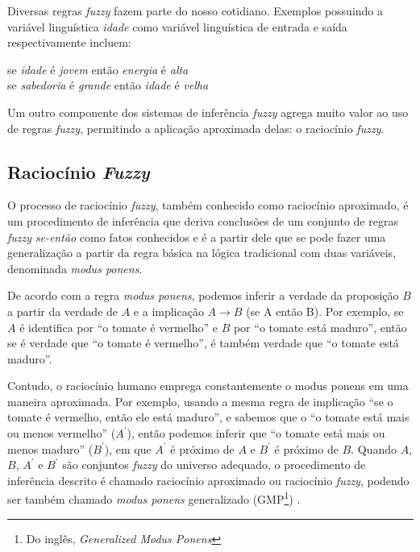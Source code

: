 Diversas regras \textit{fuzzy} fazem parte do nosso cotidiano. Exemplos possuindo a variável linguística \textit{idade} como variável linguística de entrada e saída respectivamente incluem:
\begin{center}
se \textit{idade} é \textit{jovem} então \textit{energia} é \textit{alta} \\
se \textit{sabedoria} é \textit{grande} então \textit{idade} é \textit{velha}
\end{center}

Um outro componente dos sistemas de inferência \textit{fuzzy} agrega muito valor ao uso de regras \textit{fuzzy}, permitindo a aplicação aproximada delas: o raciocínio \textit{fuzzy}.

\subsection{Raciocínio \textit{Fuzzy}}
\label{sec:raciocinio_fuzzy}

O processo de raciocínio \textit{fuzzy}, também conhecido como raciocínio aproximado, é um procedimento de inferência que deriva conclusões de um conjunto de regras \textit{fuzzy} \textit{se-então} como fatos conhecidos \cite[p.~62]{Jang1997} e é a partir dele que se pode fazer uma generalização a partir da regra básica na lógica tradicional com duas variáveis, denominada \textit{modus ponens}.

De acordo com a regra \textit{modus ponens}, podemos inferir a verdade da proposição $B$ a partir da verdade de $A$ e a implicação $A \rightarrow B$ (se A então B). Por exemplo, se $A$ é identifica por ``o tomate é vermelho'' e $B$ por ``o tomate está maduro'', então se é verdade que ``o tomate é vermelho'', é também verdade que ``o tomate está maduro''.

Contudo, o raciocínio humano emprega constantemente o modus ponens em uma maneira aproximada. Por exemplo, usando a mesma regra de implicação ``se o tomate é vermelho, então ele está maduro'', e sabemos que o ``o tomate está mais ou menos vermelho'' ($A^\prime$), então podemos inferir que ``o tomate está mais ou menos maduro'' ($B^\prime$), em que $A^\prime$ é próximo de $A$ e $B^\prime$ é próximo de $B$. Quando $A$, $B$, $A^\prime$ e $B^\prime$ são conjuntos \textit{fuzzy} do universo adequado, o procedimento de inferência descrito é chamado raciocínio aproximado ou raciocínio \textit{fuzzy}, podendo ser também chamado \textit{modus ponens} generalizado (GMP\footnote{Do inglês, \textit{Generalized Modus Ponens}}) \cite[p.~65]{Jang1997}.

